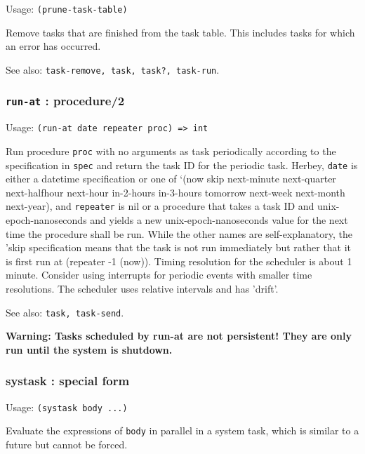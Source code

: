\documentclass[
]{article}
\newcommand{\passthrough}[1]{#1}
\begin{document}
Usage: \passthrough{\lstinline!(prune-task-table)!}

Remove tasks that are finished from the task table. This includes tasks
for which an error has occurred.

See also: \passthrough{\lstinline!task-remove, task, task?, task-run!}.

\hypertarget{run-at-procedure2}{%
\subsubsection{\texorpdfstring{\texttt{run-at} :
procedure/2}{run-at : procedure/2}}\label{run-at-procedure2}}

Usage: \passthrough{\lstinline!(run-at date repeater proc) => int!}

Run procedure \passthrough{\lstinline!proc!} with no arguments as task
periodically according to the specification in
\passthrough{\lstinline!spec!} and return the task ID for the periodic
task. Herbey, \passthrough{\lstinline!date!} is either a datetime
specification or one of `(now skip next-minute next-quarter
next-halfhour next-hour in-2-hours in-3-hours tomorrow next-week
next-month next-year), and \passthrough{\lstinline!repeater!} is nil or
a procedure that takes a task ID and unix-epoch-nanoseconds and yields a
new unix-epoch-nanoseconds value for the next time the procedure shall
be run. While the other names are self-explanatory, the 'skip
specification means that the task is not run immediately but rather that
it is first run at (repeater -1 (now)). Timing resolution for the
scheduler is about 1 minute. Consider using interrupts for periodic
events with smaller time resolutions. The scheduler uses relative
intervals and has 'drift'.

See also: \passthrough{\lstinline!task, task-send!}.

\textbf{Warning: Tasks scheduled by run-at are not persistent! They are
only run until the system is shutdown.}

\hypertarget{systask-special-form}{%
\subsubsection{systask : special form}\label{systask-special-form}}

Usage: \passthrough{\lstinline!(systask body ...)!}

Evaluate the expressions of \passthrough{\lstinline!body!} in parallel
in a system task, which is similar to a future but cannot be forced.
\end{document}
